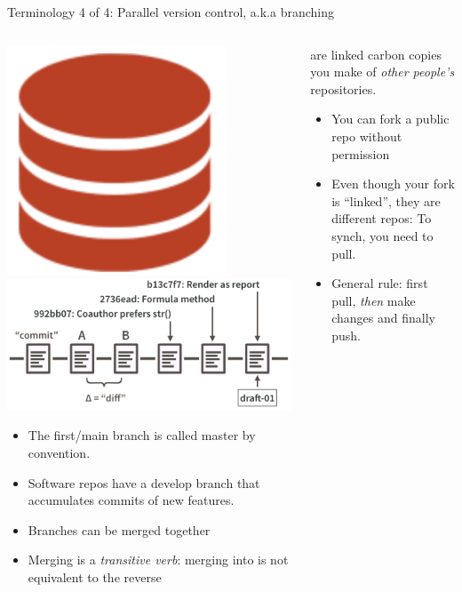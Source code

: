 \documentclass[ignorenonframetext, 10pt, aspectratio=169]{beamer}
\begin{document}
\begin{frame}{Terminology 4 of 4: Parallel version control, a.k.a branching}
\begin{columns}[T]
\begin{column}{0.45\textwidth}

\centering
\includegraphics[width =0.25\linewidth]{repo-0.png} \hspace{-1em}~ \includegraphics[width =0.5\linewidth]{commit-diff-sha-tag.png}

\small
\begin{itemize}
  \item The first/main branch is called \alert{master} by convention. \pause
  \item Software repos have a \alert{develop} branch that accumulates commits of new features.\pause
  \item Branches can be \alert{merged} together
  \item Merging is a \emph{transitive verb}: merging  into  is not equivalent to the reverse
\end{itemize}
\end{column}


\begin{column}{0.3\textwidth}
are linked carbon copies you make of \emph{other people's} repositories.\\


\small
\begin{itemize}
\item You can fork a public repo without permission
\item Even though your fork is ``linked'', they are different repos: To synch, you need to \alert{pull}.
\item General rule: first \alert{pull}, \emph{then} make changes and finally \alert{push}.
\end{itemize}



\end{column}
\end{columns}
\end{frame}
\end{document}
